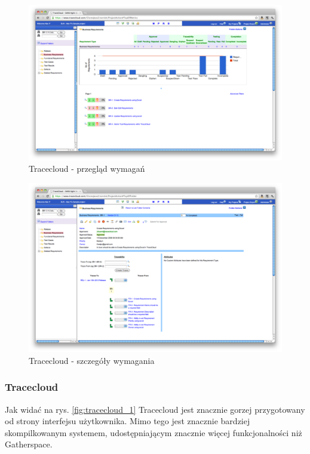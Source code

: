         \begin{figure}[t]
          \centering
          \includegraphics[width=1.0\textwidth]{img/tracecloud_3.pdf}
          \caption{Tracecloud - przegląd wymagań}
          \label{fig:tracecloud_3}
        \end{figure}

        \begin{figure}[t]
          \centering
          \includegraphics[width=1.0\textwidth]{img/tracecloud_4.pdf}
          \caption{Tracecloud - szczegóły wymagania}
          \label{fig:tracecloud_4}
        \end{figure}

      \subsubsection{Tracecloud}
        
        Jak widać na rys. \ref{fig:tracecloud_1} Tracecloud jest znacznie gorzej przygotowany od strony interfejsu użytkownika. Mimo tego jest znacznie bardziej skompilkowanym systemem, udostępniającym znacznie więcej funkcjonalności niż Gatherspace.

